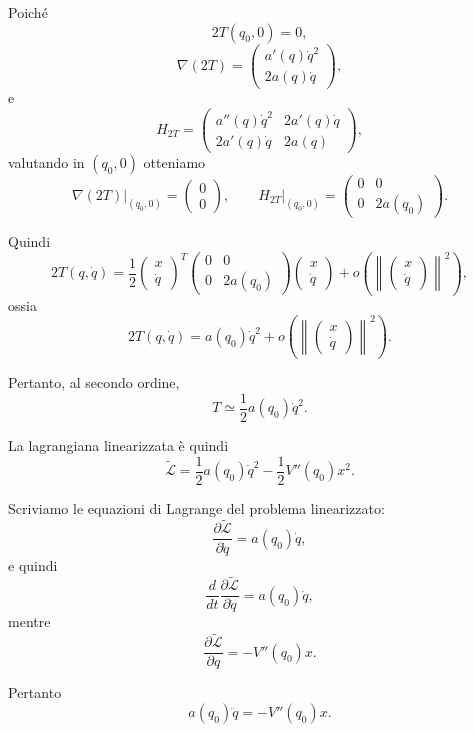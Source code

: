 Poiché
\[
2T(q_0,0)=0,
\]
\[
\nabla(2T)
=
\begin{pmatrix}
a'(q)\dot q^2\\
2a(q)\dot q
\end{pmatrix},
\]
e
\[
H_{2T}
=
\begin{pmatrix}
a''(q)\dot q^2 & 2a'(q)\dot q\\
2a'(q)\dot q & 2a(q)
\end{pmatrix},
\]
valutando in \((q_0,0)\) otteniamo
\[
\nabla(2T)\big|_{(q_0,0)}
=
\begin{pmatrix}
0\\
0
\end{pmatrix},
\qquad
H_{2T}\big|_{(q_0,0)}
=
\begin{pmatrix}
0 & 0\\
0 & 2a(q_0)
\end{pmatrix}.
\]

Quindi
\[
2T(q,\dot q)
=
\frac{1}{2}
\begin{pmatrix}
x\\
\dot q
\end{pmatrix}^{T}
\begin{pmatrix}
0 & 0\\
0 & 2a(q_0)
\end{pmatrix}
\begin{pmatrix}
x\\
\dot q
\end{pmatrix}
+
o\!\left(
\left\|
\begin{pmatrix}
x\\
\dot q
\end{pmatrix}
\right\|^2
\right),
\]
ossia
\[
2T(q,\dot q)
=
a(q_0)\dot q^2
+
o\!\left(
\left\|
\begin{pmatrix}
x\\
\dot q
\end{pmatrix}
\right\|^2
\right).
\]

Pertanto, al secondo ordine,
\[
T\simeq \frac{1}{2}a(q_0)\dot q^2.
\]

La lagrangiana linearizzata è quindi
\[
\widetilde{\mathcal L}
=
\frac{1}{2}a(q_0)\dot q^2
-
\frac{1}{2}V''(q_0)x^2.
\]

Scriviamo le equazioni di Lagrange del problema linearizzato:
\[
\frac{\partial \widetilde{\mathcal L}}{\partial \dot q}
=
a(q_0)\dot q,
\]
e quindi
\[
\frac{d}{dt}
\frac{\partial \widetilde{\mathcal L}}{\partial \dot q}
=
a(q_0)\ddot q,
\]
mentre
\[
\frac{\partial \widetilde{\mathcal L}}{\partial q}
=
-
V''(q_0)x.
\]

Pertanto
\[
a(q_0)\ddot q
=
-
V''(q_0)x.
\]

